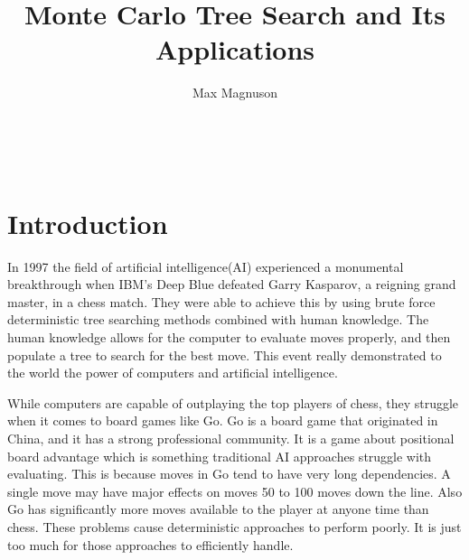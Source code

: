 \documentclass{sig-alternate}
\begin{document}

\title{Monte Carlo Tree Search and Its Applications}


\author{
\alignauthor
Max Magnuson\\
	\\
	\\
	\\
}

\maketitle
\begin{abstract}

\end{abstract}


\section{Introduction} 
In 1997 the field of artificial intelligence(AI) experienced a monumental breakthrough when IBM's Deep Blue defeated Garry Kasparov, a reigning grand master, in a chess match\cite{TheGrandChallenge}. They were able to achieve this by using brute force deterministic tree searching methods combined with human knowledge. The human knowledge allows for the computer to evaluate moves properly, and then populate a tree to search for the best move. This event really demonstrated to the world the power of computers and artificial intelligence. 

While computers are capable of outplaying the top players of chess, they struggle when it comes to board games like Go\cite{TheGrandChallenge}. Go is a board game that originated in China, and it has a strong professional community. It is a game about positional board advantage which is something traditional AI approaches struggle with evaluating. This is because moves in Go tend to have very long dependencies. A single move may have major effects on moves 50 to 100 moves down the line\cite{RAVEinGo}. Also Go has significantly more moves available to the player at anyone time than chess. These problems cause deterministic approaches to perform poorly. It is just too much for those approaches to efficiently handle.
\end{document}
